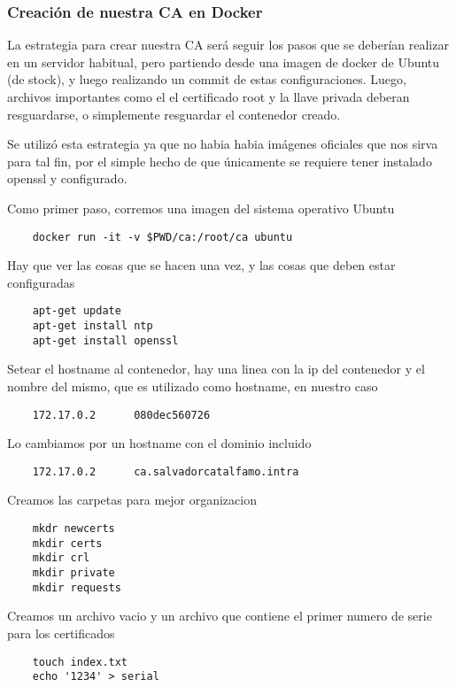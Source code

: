\subsubsection*{Creación de nuestra CA en Docker}

La estrategia para crear nuestra CA será seguir los pasos que se deberían realizar en un servidor 
habitual, pero partiendo desde una imagen de docker de Ubuntu (de stock), y luego realizando un 
commit de estas configuraciones. Luego, archivos importantes como el el certificado root y la llave
privada deberan resguardarse, o simplemente resguardar el contenedor creado. 

Se utilizó esta estrategia ya que no habia habia imágenes oficiales que nos sirva para tal fin, por el 
simple hecho de que únicamente se requiere tener instalado openssl y configurado.

\noindent Como primer paso, corremos una imagen del sistema operativo Ubuntu

\begin{verbatim}
    docker run -it -v $PWD/ca:/root/ca ubuntu
\end{verbatim}

\noindent Hay que ver las cosas que se hacen una vez, y las cosas que deben estar configuradas

\begin{verbatim}
    apt-get update
    apt-get install ntp
    apt-get install openssl
\end{verbatim}

\noindent Setear el hostname al contenedor, hay una linea con la ip del contenedor y el nombre del mismo, 
que es utilizado como hostname, en nuestro caso
\begin{verbatim}
    172.17.0.2      080dec560726
\end{verbatim}

\noindent Lo cambiamos por un hostname con el dominio incluido
\begin{verbatim}
    172.17.0.2      ca.salvadorcatalfamo.intra
\end{verbatim}

\noindent Creamos las carpetas para mejor organizacion
\begin{verbatim}
    mkdr newcerts
    mkdir certs
    mkdir crl
    mkdir private
    mkdir requests
\end{verbatim}

\noindent Creamos un archivo vacio y un archivo que contiene el primer numero de serie para los certificados 
\begin{verbatim}
    touch index.txt
    echo '1234' > serial
\end{verbatim}

